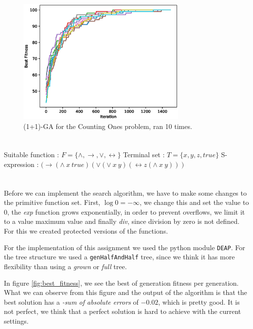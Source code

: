 \documentclass[11pt]{article}
\begin{document}
\begin{figure}[H]
\centering
\includegraphics[width=0.75\textwidth]{images/ga.eps}
\caption{(1+1)-GA for the Counting Ones problem, ran 10 times.}
\label{fig:ga}
\end{figure}

\section{}
Suitable function : $F = \{\wedge,\rightarrow, \vee,\leftrightarrow \}$
\newline Terminal set : $T = \{x,y,z,true\}$
\newline S-expression : $ (\rightarrow (\land\ x\ true)(\lor (\lor\ x\ y)(\leftrightarrow z(\land\ x\ y))) $

\section{}
Before we can implement the search algorithm, we have to make some changes to the primitive function set. 
First, $\log{0} = -\infty$, we change this and set the value to $0$, the \textit{exp} function grows exponentially, in order to prevent overflows, we limit it to a value maximum value and finally \textit{div}, since division by zero is not defined. For this we created protected versions of the functions.

For the implementation of this assignment we used the python module \texttt{DEAP}. For the tree structure we used a \texttt{genHalfAndHalf} tree, since we think it has more flexibility than using a \textit{grown} or \textit{full} tree. 

In figure \ref{fig:best_fitness}, we see the best of generation fitness per generation. What we can observe from this figure and the output of the algorithm is that the best solution has a \textit{-sum of absolute errors} of $-0.02$, which is pretty good. It is not perfect, we think that a perfect solution is hard to achieve with the current settings. 
\end{document}
